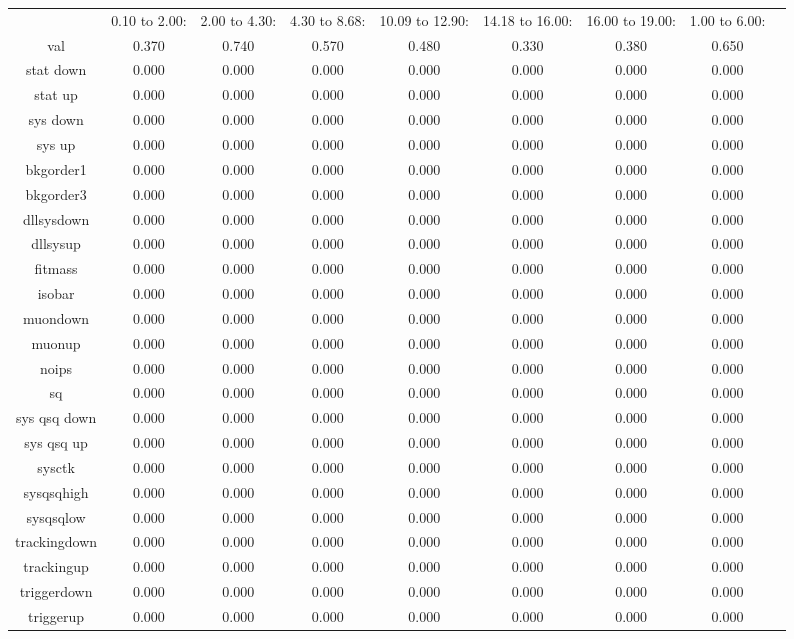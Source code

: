 \begin{table}[tbp]
\begin{tabular}{|c|c|c|c|c|c|c|c|c|}
\hline
 & 0.10 to  2.00: & 2.00 to  4.30: & 4.30 to  8.68: & 10.09 to  12.90: & 14.18 to  16.00: & 16.00 to  19.00: & 1.00 to  6.00:\\ 
val & 0.370 & 0.740 & 0.570 & 0.480 & 0.330 & 0.380 & 0.650\\ 
stat down & 0.000 & 0.000 & 0.000 & 0.000 & 0.000 & 0.000 & 0.000\\ 
stat up & 0.000 & 0.000 & 0.000 & 0.000 & 0.000 & 0.000 & 0.000\\ 
sys down & 0.000 & 0.000 & 0.000 & 0.000 & 0.000 & 0.000 & 0.000\\ 
sys up & 0.000 & 0.000 & 0.000 & 0.000 & 0.000 & 0.000 & 0.000\\ 
bkgorder1 & 0.000 & 0.000 & 0.000 & 0.000 & 0.000 & 0.000 & 0.000\\ 
bkgorder3 & 0.000 & 0.000 & 0.000 & 0.000 & 0.000 & 0.000 & 0.000\\ 
dllsysdown & 0.000 & 0.000 & 0.000 & 0.000 & 0.000 & 0.000 & 0.000\\ 
dllsysup & 0.000 & 0.000 & 0.000 & 0.000 & 0.000 & 0.000 & 0.000\\ 
fitmass & 0.000 & 0.000 & 0.000 & 0.000 & 0.000 & 0.000 & 0.000\\ 
isobar & 0.000 & 0.000 & 0.000 & 0.000 & 0.000 & 0.000 & 0.000\\ 
muondown & 0.000 & 0.000 & 0.000 & 0.000 & 0.000 & 0.000 & 0.000\\ 
muonup & 0.000 & 0.000 & 0.000 & 0.000 & 0.000 & 0.000 & 0.000\\ 
noips & 0.000 & 0.000 & 0.000 & 0.000 & 0.000 & 0.000 & 0.000\\ 
sq & 0.000 & 0.000 & 0.000 & 0.000 & 0.000 & 0.000 & 0.000\\ 
sys qsq down & 0.000 & 0.000 & 0.000 & 0.000 & 0.000 & 0.000 & 0.000\\ 
sys qsq up & 0.000 & 0.000 & 0.000 & 0.000 & 0.000 & 0.000 & 0.000\\ 
sysctk & 0.000 & 0.000 & 0.000 & 0.000 & 0.000 & 0.000 & 0.000\\ 
sysqsqhigh & 0.000 & 0.000 & 0.000 & 0.000 & 0.000 & 0.000 & 0.000\\ 
sysqsqlow & 0.000 & 0.000 & 0.000 & 0.000 & 0.000 & 0.000 & 0.000\\ 
trackingdown & 0.000 & 0.000 & 0.000 & 0.000 & 0.000 & 0.000 & 0.000\\ 
trackingup & 0.000 & 0.000 & 0.000 & 0.000 & 0.000 & 0.000 & 0.000\\ 
triggerdown & 0.000 & 0.000 & 0.000 & 0.000 & 0.000 & 0.000 & 0.000\\ 
triggerup & 0.000 & 0.000 & 0.000 & 0.000 & 0.000 & 0.000 & 0.000\\ 
\hline
\end{tabular}
\end{table}
